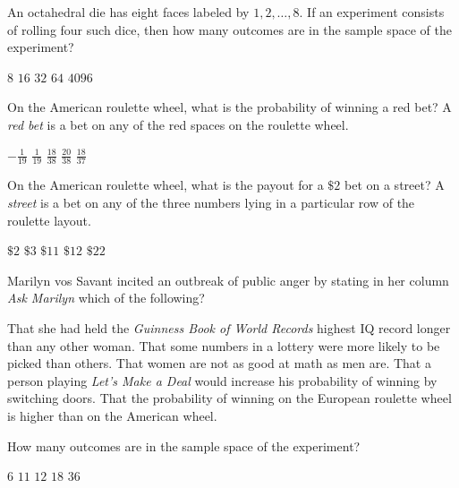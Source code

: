 \documentclass[answers,12pt]{exam}
\begin{document}
\begin{questions}
\question An octahedral die has eight faces labeled by $1,2,\ldots,8$.
If an experiment consists of rolling four such dice, then how
many outcomes are in the sample space of the experiment?\\
\begin{oneparchoices}
\choice $8$ %
\choice $16$
\choice $32$ %
\choice $64$ %
\correctchoice $4096$
\end{oneparchoices}

\question On the American roulette wheel,
what is the probability of winning a
red bet? A {\em red bet} is a bet on any of the red spaces
on the roulette wheel.\\
\begin{oneparchoices}
\choice $-\frac{1}{19}$
\choice $\frac{1}{19}$
\choice $\frac{18}{38}$
\choice $\frac{20}{38}$
\correctchoice $\frac{18}{37}$
\end{oneparchoices}

\question On the American roulette wheel, what is the payout
for a $\$2$ bet on a street? A {\em street} is a bet
on any of the three numbers lying in a particular
row of the roulette layout.\\
\begin{oneparchoices}
\choice $\$2$
\choice $\$3$
\choice $\$11$
\choice $\$12$
\correctchoice $\$22$
\end{oneparchoices}

\question Marilyn vos Savant incited an outbreak of public
anger by stating in her column {\em Ask Marilyn} which
of the following?\\
\begin{choices}
\choice That she had held the {\em Guinness Book of World Records}
highest IQ record longer than any other woman.
\choice That some numbers in a lottery were more
likely to be picked than others.
\choice That women are not as good at math as men are.
\correctchoice That a person playing {\em Let's Make a Deal}
would increase his probability of winning by switching doors.
\choice That the probability of winning on the European
roulette wheel is higher than on the American wheel.
\end{choices}


\question\label{FirstDice}
How many outcomes are in the sample space of the experiment?\\
\begin{oneparchoices}
\choice $6$ %
\choice $11$ %
\choice $12$ %
\choice $18$
\correctchoice $36$
\end{oneparchoices}


\end{questions}
\end{document}
